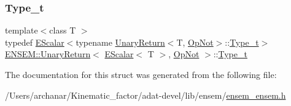 \mbox{\label{structENSEM_1_1UnaryReturn_3_01EScalar_3_01T_01_4_00_01OpNot_01_4_a4e2b815087a9bd3d66be855deee7a1e5}} 
\subsubsection{\texorpdfstring{Type\_t}{Type\_t}\hspace{0.1cm}{\footnotesize\ttfamily [3/3]}}
{\footnotesize\ttfamily template$<$class T $>$ \\
typedef \mbox{\hyperlink{classENSEM_1_1EScalar}{E\+Scalar}}$<$typename \mbox{\hyperlink{structENSEM_1_1UnaryReturn}{Unary\+Return}}$<$T, \mbox{\hyperlink{structENSEM_1_1OpNot}{Op\+Not}}$>$\+::\mbox{\hyperlink{structENSEM_1_1UnaryReturn_3_01EScalar_3_01T_01_4_00_01OpNot_01_4_a4e2b815087a9bd3d66be855deee7a1e5}{Type\+\_\+t}}$>$ \mbox{\hyperlink{structENSEM_1_1UnaryReturn}{E\+N\+S\+E\+M\+::\+Unary\+Return}}$<$ \mbox{\hyperlink{classENSEM_1_1EScalar}{E\+Scalar}}$<$ T $>$, \mbox{\hyperlink{structENSEM_1_1OpNot}{Op\+Not}} $>$\+::\mbox{\hyperlink{structENSEM_1_1UnaryReturn_3_01EScalar_3_01T_01_4_00_01OpNot_01_4_a4e2b815087a9bd3d66be855deee7a1e5}{Type\+\_\+t}}}



The documentation for this struct was generated from the following file\+:\begin{DoxyCompactItemize}
\item 
/\+Users/archanar/\+Kinematic\+\_\+factor/adat-\/devel/lib/ensem/\mbox{\hyperlink{adat-devel_2lib_2ensem_2ensem__ensem_8h}{ensem\+\_\+ensem.\+h}}\end{DoxyCompactItemize}
